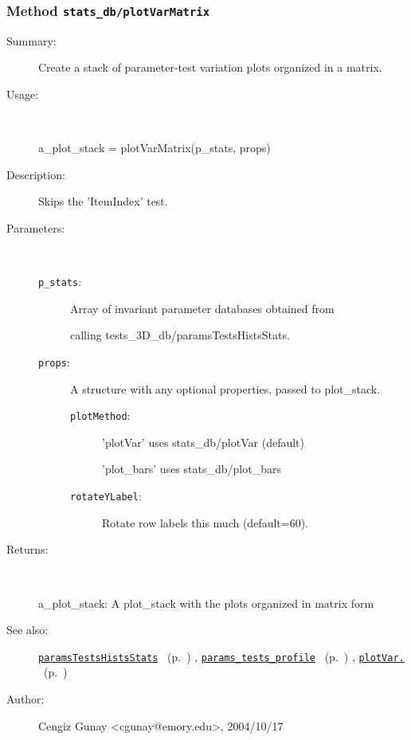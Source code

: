 \subsubsection[Method \texttt{plotVarMatrix}]{Method \texttt{stats\_db/plotVarMatrix}}%
%
\label{ref_stats_db__plotVarMatrix}%
\hypertarget{ref_stats_db__plotVarMatrix}{}%
\begin{description}
\item[Summary:]Create a stack of parameter-test variation plots organized in a matrix.
%
\item[Usage:]~%
\begin{lyxcode}%
a\_plot\_stack = plotVarMatrix(p\_stats, props)
%
\end{lyxcode}%
%
\item[Description:]%
Skips the 'ItemIndex' test.
\item[Parameters:]~
\begin{description}%
\item[\texttt{p\_stats}:]
 Array of invariant parameter databases obtained from

calling tests\_3D\_db/paramsTestsHistsStats.
\item[\texttt{props}:]
 A structure with any optional properties, passed to plot\_stack.
\begin{description}%
\item[\texttt{plotMethod}:]
 'plotVar' uses stats\_db/plotVar (default)

'plot\_bars' uses stats\_db/plot\_bars
\item[\texttt{rotateYLabel}:]
 Rotate row labels this much (default=60).
\end{description}%
\end{description}%
%
\item[Returns:
]~

	a\_plot\_stack: A plot\_stack with the plots organized in matrix form
%
%
\item[See also:]%
\hyperlink{ref_paramsTestsHistsStats}{\texttt{paramsTestsHistsStats}}%
\ (p.~\pageref{ref_paramsTestsHistsStats})%
%
, \hyperlink{ref_params_tests_profile}{\texttt{params\_tests\_profile}}%
\ (p.~\pageref{ref_params_tests_profile})%
%
, \hyperlink{ref_plotVar.}{\texttt{plotVar.}}%
\ (p.~\pageref{ref_plotVar.})%
%
%
\item[Author:]%
Cengiz Gunay <cgunay@emory.edu>, 2004/10/17
%
\end{description}
\methodline%
